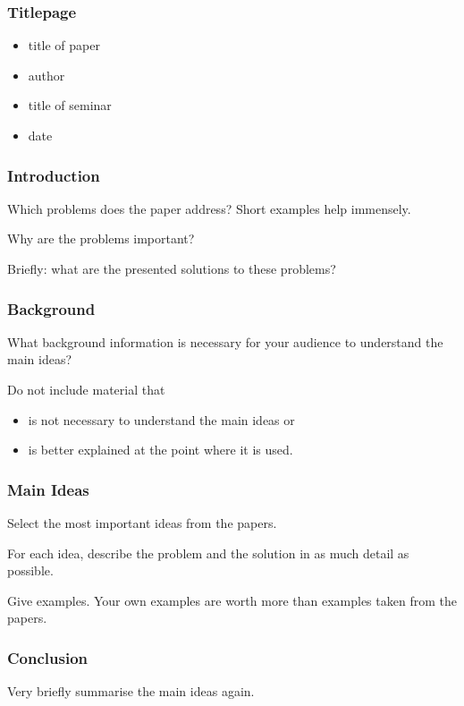 \documentclass[xetex]{beamer}
\begin{document}
\begin{frame}
  \frametitle{Titlepage}

  \begin{itemize}
    \item title of paper
    \item author
    \item title of seminar
    \item date
  \end{itemize}
\end{frame}

\begin{frame}
  \frametitle{Introduction}

  Which problems does the paper address? Short examples help immensely.

  \medskip
  \pause

  Why are the problems important?

  \medskip
  \pause

  Briefly: what are the presented solutions to these problems?
\end{frame}

\begin{frame}
  \frametitle{Background}

  What background information is necessary for your audience to understand the main ideas?

  \medskip
  \pause

  Do not include material that
  \begin{itemize}
    \item is not necessary to understand the main ideas or
    \item is better explained at the point where it is used.
  \end{itemize}
\end{frame}

\begin{frame}
  \frametitle{Main Ideas}

  Select the most important ideas from the papers.

  \medskip
  \pause

  For each idea, describe the problem and the solution in as much detail as possible.

  \medskip
  \pause

  Give examples. Your own examples are worth more than examples taken from the papers.
\end{frame}

\begin{frame}
  \frametitle{Conclusion}

  Very briefly summarise the main ideas again.
\end{frame}
\end{document}
